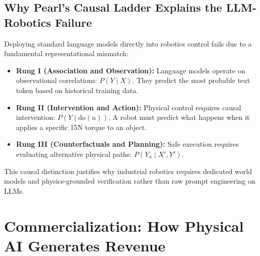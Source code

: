 \documentclass[11pt,a4paper]{article}
\begin{document}
\subsection{Why Pearl's Causal Ladder Explains the LLM-Robotics Failure}
Deploying standard language models directly into robotics control fails due to a fundamental representational mismatch:
\begin{itemize}
    \item \textbf{Rung I (Association and Observation):} Language models operate on observational correlations: $P(Y \mid X)$. They predict the most probable text token based on historical training data.
    \item \textbf{Rung II (Intervention and Action):} Physical control requires causal intervention: $P(Y \mid \text{do}(u))$. A robot must predict what happens when it applies a specific 15N torque to an object.
    \item \textbf{Rung III (Counterfactuals and Planning):} Safe execution requires evaluating alternative physical paths: $P(Y_u \mid X', Y')$.
\end{itemize}
This causal distinction justifies why industrial robotics requires dedicated world models and physics-grounded verification rather than raw prompt engineering on LLMs.

\section{Commercialization: How Physical AI Generates Revenue}
\end{document}
